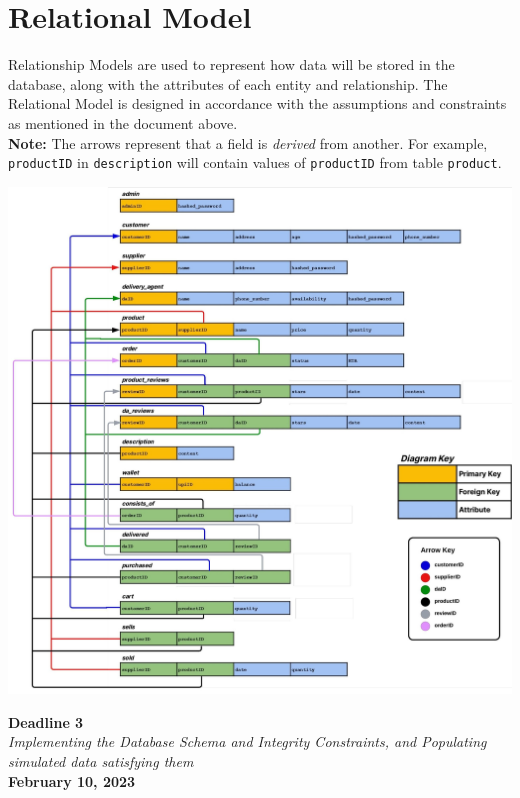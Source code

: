 \documentclass[12pt]{report}
\newcommand{\deadline}[3]{
    \hspace{0pt}
    \vfill
    \begin{center}
        \Huge \textbf{Deadline #1} \\
        \vspace*{5pt}
        \Large \textit{#2} \\
        \vspace*{25pt}
        \large \textbf{#3}
    \end{center}
    \vfill
    \pagebreak
}
\begin{document}
    \section*{\Huge Relational Model}
    \vspace*{10pt}
    Relationship Models are used to represent how data will be stored in the database, along with the attributes of each entity and relationship.
    The Relational Model is designed in accordance with the assumptions and constraints as mentioned in the document above. \\
    \newline
    \textbf{Note:} The arrows represent that a field is \textit{derived} from another.
    For example, \texttt{productID} in \texttt{description} will contain values of \texttt{productID} from table \texttt{product}.
    \pagebreak
    \vspace*{35pt}
    \begin{center}
        \hspace*{-40pt}
        \includegraphics[scale=0.8]{Assets/Relational-Model}
    \end{center}

    \pagebreak

    \deadline{3}{Implementing the Database Schema and Integrity Constraints, and Populating simulated data satisfying them}{February 10, 2023}
\end{document}
